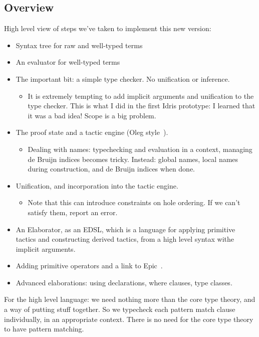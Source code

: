 \subsection{Overview}

High level view of steps we've taken to implement this new version:

\begin{itemize}
\item Syntax tree for raw and well-typed terms
\item An evaluator for well-typed terms
\item The important bit: a simple type checker. No unification or
  inference.
\begin{itemize}
  \item It is extremely tempting to add implicit arguments and unification to the
        type checker. This is what I did in the first Idris prototype: I learned
        that it was a bad idea! Scope is a big problem.
\end{itemize}
\item The proof state and a tactic engine (Oleg style~\cite{McBride1999}).
\begin{itemize}
  \item Dealing with names: typechecking and evaluation in a context, managing de Bruijn
        indices becomes tricky. Instead: global names, local names during construction,
        and de Bruijn indices when done.
\end{itemize}
\item Unification, and incorporation into the tactic engine.
\begin{itemize}
  \item Note that this can introduce constraints on hole ordering. If we can't satisfy them,
        report an error.
\end{itemize}
\item An Elaborator, as an EDSL, which is a language for applying primitive tactics and
      constructing derived tactics, from a high level syntax withe implicit arguments.
\item Adding primitive operators and a link to Epic~\cite{brady2011epic}.
\item Advanced elaborations: using declarations, where clauses, type classes.
\end{itemize}

For the high level language: we need nothing more than the core type theory,
and a way of putting stuff together. So we typecheck each pattern match clause
individually, in an appropriate context. There is no need for the core type
theory to have pattern matching.
